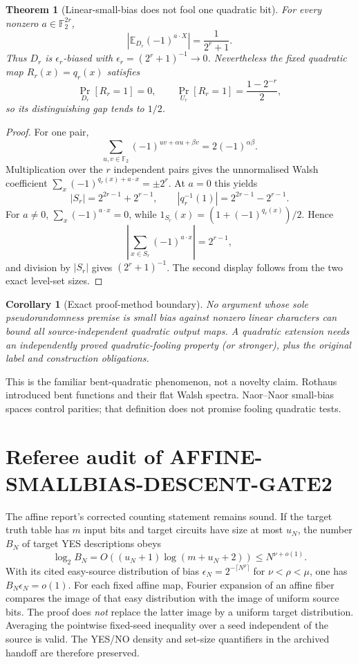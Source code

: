 \documentclass[11pt]{article}
\newtheorem{theorem}{Theorem}
\newtheorem{corollary}{Corollary}
\begin{document}
\begin{theorem}[Linear-small-bias does not fool one quadratic bit]
For every nonzero $a\in\mathbb F_2^{2r}$,
\[
 \left|\mathbb E_{D_r}(-1)^{a\cdot X}\right|=\frac{1}{2^r+1}.
\]
Thus $D_r$ is $\epsilon_r$-biased with $\epsilon_r=(2^r+1)^{-1}\to0$.
Nevertheless the fixed quadratic map $R_r(x)=q_r(x)$ satisfies
\[
 \Pr_{D_r}[R_r=1]=0,
 \qquad
 \Pr_{U_r}[R_r=1]=\frac{1-2^{-r}}{2},
\]
so its distinguishing gap tends to $1/2$.
\end{theorem}
\begin{proof}
For one pair,
\[
 \sum_{u,v\in\mathbb F_2}(-1)^{uv+\alpha u+\beta v}
 =2(-1)^{\alpha\beta}.
\]
Multiplication over the $r$ independent pairs gives the unnormalised Walsh
coefficient $\sum_x(-1)^{q_r(x)+a\cdot x}=\pm2^r$.  At $a=0$ this yields
\[
 |S_r|=2^{2r-1}+2^{r-1},\qquad
 |q_r^{-1}(1)|=2^{2r-1}-2^{r-1}.
\]
For $a\ne0$, $\sum_x(-1)^{a\cdot x}=0$, while
$1_{S_r}(x)=(1+(-1)^{q_r(x)})/2$.  Hence
\[
 \left|\sum_{x\in S_r}(-1)^{a\cdot x}\right|=2^{r-1},
\]
and division by $|S_r|$ gives $(2^r+1)^{-1}$.  The second display follows
from the two exact level-set sizes.
\end{proof}

\begin{corollary}[Exact proof-method boundary]
No argument whose sole pseudorandomness premise is small bias against nonzero
linear characters can bound all source-independent quadratic output maps.  A
quadratic extension needs an independently proved quadratic-fooling property
(or stronger), plus the original label and construction obligations.
\end{corollary}

This is the familiar bent-quadratic phenomenon, not a novelty claim.  Rothaus
introduced bent functions and their flat Walsh spectra.  Naor--Naor small-bias
spaces control parities; that definition does not promise fooling quadratic
tests.

\section{Referee audit of AFFINE-SMALLBIAS-DESCENT-GATE2}
The affine report's corrected counting statement remains sound.  If the target
truth table has $m$ input bits and target circuits have size at most $u_N$, the
number $B_N$ of target YES descriptions obeys
\[
 \log_2 B_N=O((u_N+1)\log(m+u_N+2))\le N^{\nu+o(1)}.
\]
With its cited easy-source distribution of bias
$\epsilon_N=2^{-\lceil N^\rho\rceil}$ for $\nu<\rho<\mu$, one has
$B_N\epsilon_N=o(1)$.  For each fixed affine map, Fourier expansion of an affine
fiber compares the image of that easy distribution with the image of uniform
source bits.  The proof does \emph{not} replace the latter image by a uniform
target distribution.  Averaging the pointwise fixed-seed inequality over a seed
independent of the source is valid.  The YES/NO density and set-size quantifiers
in the archived handoff are therefore preserved.
\end{document}
